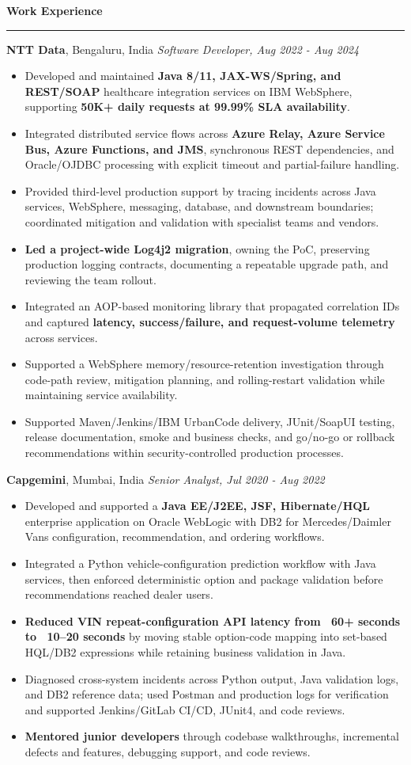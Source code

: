 \documentclass[11pt,letterpaper]{article}
\newcommand{\ressection}[1]{\Needspace{6\baselineskip}\vspace{8pt}\par\textbf{#1}\par\vspace{2pt}\hrule\vspace{5pt}}
\begin{document}
\ressection{Work Experience}
\textbf{NTT Data}, Bengaluru, India \hfill \textit{Software Developer, Aug 2022 - Aug 2024}
\begin{itemize}
  \item Developed and maintained \textbf{Java 8/11, JAX-WS/Spring, and REST/SOAP} healthcare integration services on IBM WebSphere, supporting \textbf{50K+ daily requests at 99.99\% SLA availability}.
  \item Integrated distributed service flows across \textbf{Azure Relay, Azure Service Bus, Azure Functions, and JMS}, synchronous REST dependencies, and Oracle/OJDBC processing with explicit timeout and partial-failure handling.
  \item Provided third-level production support by tracing incidents across Java services, WebSphere, messaging, database, and downstream boundaries; coordinated mitigation and validation with specialist teams and vendors.
  \item \textbf{Led a project-wide Log4j2 migration}, owning the PoC, preserving production logging contracts, documenting a repeatable upgrade path, and reviewing the team rollout.
  \item Integrated an AOP-based monitoring library that propagated correlation IDs and captured \textbf{latency, success/failure, and request-volume telemetry} across services.
  \item Supported a WebSphere memory/resource-retention investigation through code-path review, mitigation planning, and rolling-restart validation while maintaining service availability.
  \item Supported Maven/Jenkins/IBM UrbanCode delivery, JUnit/SoapUI testing, release documentation, smoke and business checks, and go/no-go or rollback recommendations within security-controlled production processes.
\end{itemize}
\textbf{Capgemini}, Mumbai, India \hfill \textit{Senior Analyst, Jul 2020 - Aug 2022}
\begin{itemize}
  \item Developed and supported a \textbf{Java EE/J2EE, JSF, Hibernate/HQL} enterprise application on Oracle WebLogic with DB2 for Mercedes/Daimler Vans configuration, recommendation, and ordering workflows.
  \item Integrated a Python vehicle-configuration prediction workflow with Java services, then enforced deterministic option and package validation before recommendations reached dealer users.
  \item \textbf{Reduced VIN repeat-configuration API latency from ~60+ seconds to ~10--20 seconds} by moving stable option-code mapping into set-based HQL/DB2 expressions while retaining business validation in Java.
  \item Diagnosed cross-system incidents across Python output, Java validation logs, and DB2 reference data; used Postman and production logs for verification and supported Jenkins/GitLab CI/CD, JUnit4, and code reviews.
  \item \textbf{Mentored junior developers} through codebase walkthroughs, incremental defects and features, debugging support, and code reviews.
\end{itemize}
\end{document}

